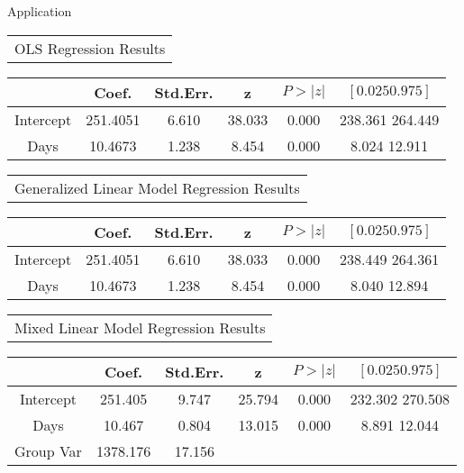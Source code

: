 \documentclass[unknownkeysallowed]{beamer}
\begin{document}
\begin{frame}{Application}
\begin{center}
\begin{tabular}{ c c c c }
\multicolumn{4}{c}{OLS Regression Results} \\
\end{tabular}
\begin{tabular}{ c c c c c c }
 & Coef. & Std.Err. & z & $P>|z|$  & $[0.025  0.975]$\\
\hline
Intercept & 251.4051 & 6.610 & 38.033 & 0.000 & 238.361  264.449\\
Days & 10.4673 & 1.238 & 8.454 & 0.000 & 8.024  12.911\\
\hline
\end{tabular}
\end{center}
\begin{center}
\begin{tabular}{ c c c c }
\multicolumn{4}{c}{Generalized Linear Model Regression Results} \\
\end{tabular}
\begin{tabular}{ c c c c c c }
 & Coef. & Std.Err. & z & $P>|z|$  & $[0.025  0.975]$\\
\hline
Intercept & 251.4051 & 6.610 & 38.033 & 0.000 & 238.449  264.361\\
Days & 10.4673 & 1.238 & 8.454 & 0.000 & 8.040  12.894\\
\hline
\end{tabular}
\end{center}


\begin{center}
\begin{tabular}{ c c c c }
\multicolumn{4}{c}{Mixed Linear Model Regression Results} \\
\end{tabular}
\begin{tabular}{ c c c c c c }
 & Coef. & Std.Err. & z & $P>|z|$  & $[0.025  0.975]$\\
\hline
Intercept & 251.405 & 9.747 & 25.794 & 0.000 & 232.302 270.508\\
Days & 10.467 & 0.804 & 13.015 & 0.000 & 8.891  12.044\\
Group Var & 1378.176 & 17.156 & & & \\
\hline
\end{tabular}
\end{center}
\end{frame}
\end{document}
